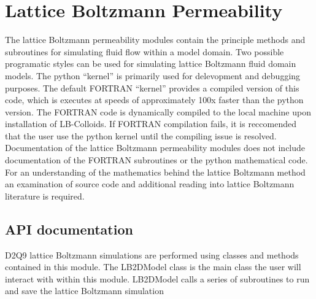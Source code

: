 \documentclass[letterpaper,10pt,english]{sphinxmanual}
\begin{document}
\section{Lattice Boltzmann Permeability}
\label{\detokenize{index:lattice-boltzmann-permeability}}
The lattice Boltzmann permeability modules contain the principle methods and subroutines for simulating fluid flow within a model domain. Two possible programatic styles can be used for simulating lattice Boltzmann fluid domain models. The python “kernel” is primarily used for delevopment and debugging purposes. The default FORTRAN “kernel” provides a compiled version of this code, which is executes at speeds of approximately 100x faster than the python version. The FORTRAN code is dynamically compiled to the local machine upon installation of LB-Colloids. If FORTRAN compilation fails, it is reccomended that the user use the python kernel until the compiling issue is resolved. Documentation of the lattice Boltzmann permeability modules does not include documentation of the FORTRAN subroutines or the python mathematical code. For an understanding of the mathematics behind the lattice Boltzmann method an examination of source code and additional reading into lattice Boltzmann literature is required.


\subsection{API documentation}
\label{\detokenize{index:id4}}\label{\detokenize{index:module-lb_colloids.LB.LB_2Dpermeability}}
D2Q9 lattice Boltzmann simulations are performed using classes and methods
contained in this module. The LB2DModel class is the main class the user
will interact with within this module. LB2DModel calls a series of subroutines
to run and save the lattice Boltzmann simulation
\end{document}
